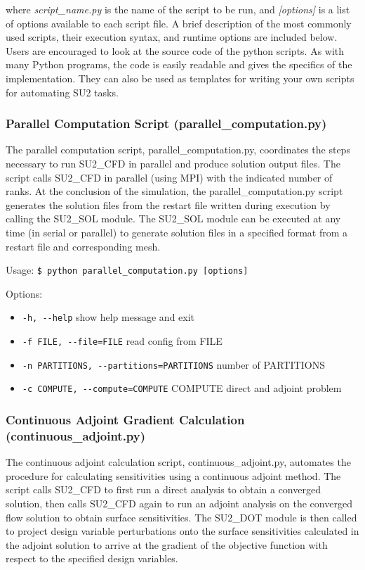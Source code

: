 \documentclass{article}
\begin{document}
where \textit{script\_name.py} is the name of the script to be run, and \textit{[options]} is a list of options available to each script file. A brief description of the most commonly used scripts, their execution syntax, and runtime options are included below. Users are encouraged to look at the source code of the python scripts. As with many Python programs, the code is easily readable and gives the specifics of the implementation. They can also be used as templates for writing your own scripts for automating SU2 tasks.

\subsubsection{Parallel Computation Script (parallel\_computation.py)}

The parallel computation script, parallel\_computation.py, coordinates the steps necessary to run SU2\_CFD in parallel and produce solution output files. The script calls SU2\_CFD in parallel (using MPI) with the indicated number of ranks. At the conclusion of the simulation, the parallel\_computation.py script generates the solution files from the restart file written during execution by calling the SU2\_SOL module. The SU2\_SOL module can be executed at any time (in serial or parallel) to generate solution files in a specified format from a restart file and corresponding mesh.

Usage: \verb|$ python parallel_computation.py [options]|

Options:

\begin{itemize}
    \item \verb|-h, --help| show help message and exit
    \item \verb|-f FILE, --file=FILE| read config from FILE
    \item \verb|-n PARTITIONS, --partitions=PARTITIONS| number of PARTITIONS
    \item \verb|-c COMPUTE, --compute=COMPUTE| COMPUTE direct and adjoint problem
\end{itemize}
    

\subsubsection{Continuous Adjoint Gradient Calculation (continuous\_adjoint.py)}

The continuous adjoint calculation script, continuous\_adjoint.py, automates the procedure for calculating sensitivities using a continuous adjoint method. The script calls SU2\_CFD to first run a direct analysis to obtain a converged solution, then calls SU2\_CFD again to run an adjoint analysis on the converged flow solution to obtain surface sensitivities. The SU2\_DOT module is then called to project design variable perturbations onto the surface sensitivities calculated in the adjoint solution to arrive at the gradient of the objective function with respect to the specified design variables.
\end{document}
